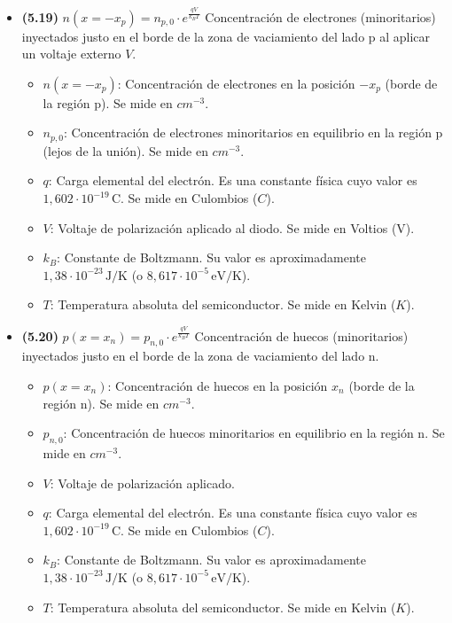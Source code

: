 \documentclass{article}
\begin{document}
\begin{itemize}
				\item \textbf{(5.19)} $\boxed{n(x = -x_p) = n_{p,0} \cdot e^{\frac{qV}{k_B T}}}$ Concentración de electrones (minoritarios) inyectados justo en el borde de la zona de vaciamiento del lado p al aplicar un voltaje externo $V$.
					\begin{itemize}
						\item $n(x = -x_p)$: Concentración de electrones en la posición $-x_p$ (borde de la región p). Se mide en $cm^{-3}$.
						\item $n_{p,0}$: Concentración de electrones minoritarios en equilibrio en la región p (lejos de la unión). Se mide en $cm^{-3}$.
						\item $q$: Carga elemental del electrón. Es una constante física cuyo valor es $1,602\cdot10^{-19}\,\text{C}$. Se mide en Culombios ($C$).
						\item $V$: Voltaje de polarización aplicado al diodo. Se mide en Voltios (V).
						\item $k_B$: Constante de Boltzmann. Su valor es aproximadamente $1,38 \cdot 10^{-23}\,\text{J/K}$ (o $8,617 \cdot 10^{-5}\,\text{eV/K}$).
						\item $T$: Temperatura absoluta del semiconductor. Se mide en Kelvin ($K$).
					\end{itemize}

				\item \textbf{(5.20)} $\boxed{p(x = x_n) = p_{n,0} \cdot e^{\frac{qV}{k_B T}}}$ Concentración de huecos (minoritarios) inyectados justo en el borde de la zona de vaciamiento del lado n.
					\begin{itemize}
						\item $p(x = x_n)$: Concentración de huecos en la posición $x_n$ (borde de la región n). Se mide en $cm^{-3}$.
						\item $p_{n,0}$: Concentración de huecos minoritarios en equilibrio en la región n. Se mide en $cm^{-3}$.
						\item $V$: Voltaje de polarización aplicado.
						\item $q$: Carga elemental del electrón. Es una constante física cuyo valor es $1,602\cdot10^{-19}\,\text{C}$. Se mide en Culombios ($C$).
						\item $k_B$: Constante de Boltzmann. Su valor es aproximadamente $1,38 \cdot 10^{-23}\,\text{J/K}$ (o $8,617 \cdot 10^{-5}\,\text{eV/K}$).
						\item $T$: Temperatura absoluta del semiconductor. Se mide en Kelvin ($K$).
					\end{itemize}


\end{itemize}
\end{document}
